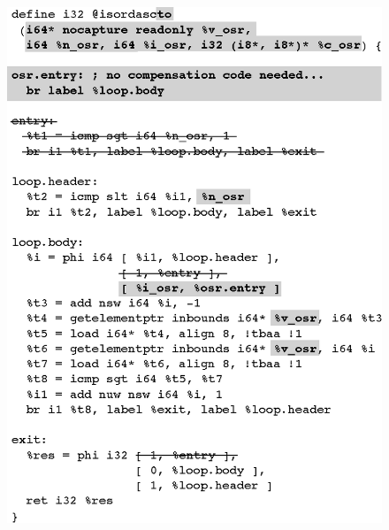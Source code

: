 \ifdefined\noauthorea
\begin{figure}[t]
\begin{center}
\includegraphics[width=0.9\columnwidth]{figures/isordascto/isordascto.eps}
\caption{\protect}
\end{center}
\end{figure}
\fi

